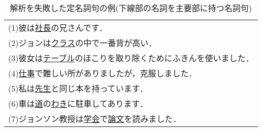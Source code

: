 \begin{table}[t]
\small

\caption{解析を失敗した定名詞句の例(下線部の名詞を主要部に持つ名詞句)}\label{fig:false_tei}


{
  \begin{center}
\begin{tabular}{|p{300pt}|} \hline


(1)彼は\underline{社長}の兄さんです．\\ 
  

(2)ジョンは\underline{クラス}の中で一番背が高い．\\ 
  

(3)彼女は\underline{テーブル}のほこりを取り除くためにふきんを使いました．\\ 


(4)\underline{仕事}で難しい所がありましたが，克服しました．\\ 
  

(5)私は\underline{先生}と同じ本を持っています．\\ 


(6)車は\underline{道}の\underline{わき}に駐車してあります．\\ 


(7)ジョンソン教授は\underline{学会}で\underline{論文}を読みました．\\[0.1cm] \hline
\end{tabular}
    
  \end{center}
}

\end{table}


